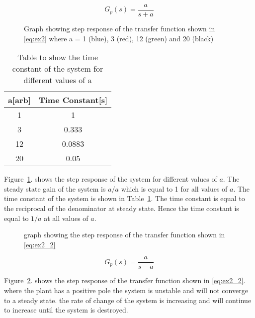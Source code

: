 
\begin{equation}
    G_{p}\left(s\right)=\frac{a}{s+a}
    \label{eq:ex2}
\end{equation}

\begin{figure}[ht!]
    \centering
    
    \caption{Graph showing step response of the transfer function shown in \eqref{eq:ex2} where a = 1 (blue), 3 (red), 12 (green) and 20 (black) }
    \label{fig:ex2}
\end{figure}\FloatBarrier

\begin{table}[ht!]
    \centering
    \begin{tabular}{|c|c|}
        \hline
        a{[}arb{]} & Time Constant{[}s{]} \\ \hline
        1          & 1                    \\ \hline
        3          & 0.333                \\ \hline
        12         & 0.0883               \\ \hline
        20         & 0.05                 \\ \hline
    \end{tabular}
    \caption{Table to show the time constant of the system for different values of a}
    \label{tab:ex2}
\end{table}\FloatBarrier

Figure~\ref{fig:ex2}. shows the step response of the system for different values of $a$. The steady state gain of the system is $a/a$ which is equal to 1 for all values of $a$. The time constant of the system is shown in Table~\ref{tab:ex2}. The time constant is equal to the reciprocal of the denominator at steady state. Hence the time constant is equal to $1/a$ at all values of $a$.\\

\begin{figure}[ht!]
    \centering
    
    \caption{graph showing the step response of the transfer function shown in \eqref{eq:ex2_2} }
    \label{fig:ex2_2}
\end{figure}\FloatBarrier

\begin{equation}
    G_{p}\left(s\right)=\frac{a}{s-a}
    \label{eq:ex2_2}
\end{equation}

Figure~\ref{fig:ex2_2}. shows the step response of the transfer function shown in \eqref{eq:ex2_2}. where the plant has a positive pole the system is unstable and will not converge to a steady state. the rate of change of the system is increasing and will continue to increase until the system is destroyed. 

